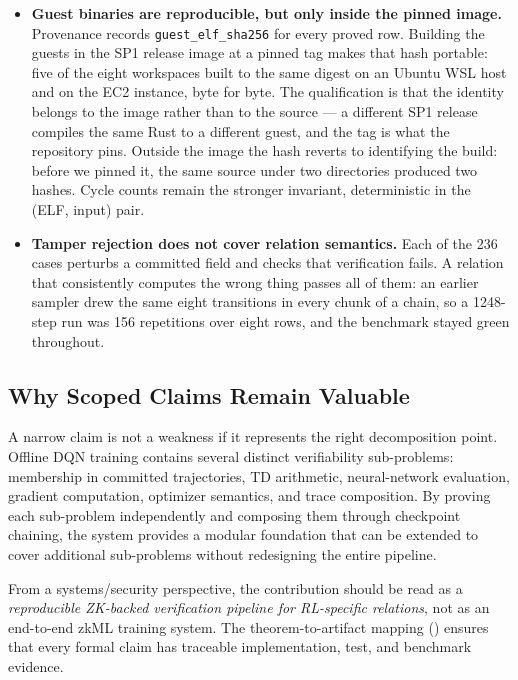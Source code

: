 \begin{itemize}[leftmargin=1.5em]
  \item \textbf{Guest binaries are reproducible, but only inside the pinned
  image.} Provenance records \texttt{guest\_elf\_sha256} for every proved row.
  Building the guests in the SP1 release image at a pinned tag makes that hash
  portable: five of the eight workspaces built to the same digest on an Ubuntu
  WSL host and on the EC2 instance, byte for byte. The qualification is that the
  identity belongs to the image rather than to the source --- a different SP1
  release compiles the same Rust to a different guest, and the tag is what the
  repository pins. Outside the image the hash reverts to identifying the build:
  before we pinned it, the same source under two directories produced two
  hashes. Cycle counts remain the stronger invariant, deterministic in the
  (ELF, input) pair.

  \item \textbf{Tamper rejection does not cover relation semantics.} Each of
  the 236 cases perturbs a committed field and checks that verification fails.
  A relation that consistently computes the wrong thing passes all of them: an
  earlier sampler drew the same eight transitions in every chunk of a chain, so
  a 1248-step run was 156 repetitions over eight rows, and the benchmark stayed
  green throughout.
\end{itemize}

\subsection{Why Scoped Claims Remain Valuable}

A narrow claim is not a weakness if it represents the right decomposition
point. Offline DQN training contains several distinct verifiability
sub-problems: membership in committed trajectories, TD arithmetic,
neural-network evaluation, gradient computation, optimizer semantics, and
trace composition. By proving each sub-problem independently and composing
them through checkpoint chaining, the system provides a modular foundation
that can be extended to cover additional sub-problems without redesigning
the entire pipeline.

From a systems/security perspective, the contribution should be read as a
\emph{reproducible ZK-backed verification pipeline for RL-specific relations},
not as an end-to-end zkML training system. The theorem-to-artifact mapping
() ensures that every formal claim has traceable
implementation, test, and benchmark evidence.

